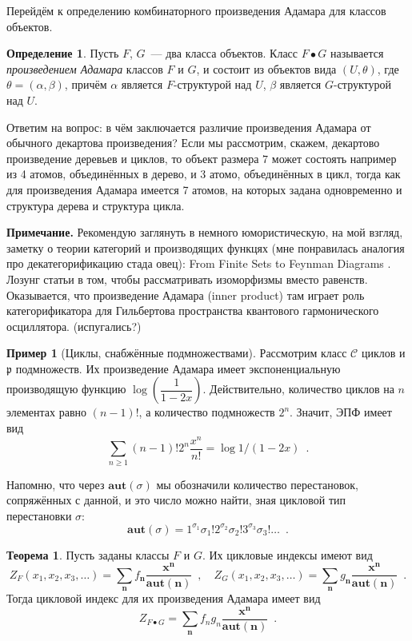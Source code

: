 \documentclass{article}
\def \vec {\boldsymbol}
\theoremstyle{definition}
\newtheorem{example}{Пример}
\newtheorem*{theorem}{Теорема}
\newtheorem*{definition}{Определение}
\begin{document}
Перейдём к определению комбинаторного произведения Адамара для классов объектов.
\begin{definition}
    Пусть \( F \), \( G\)~--- два класса объектов. Класс \( F \bullet G \)
называется \textit{произведением Адамара} классов \( F \) и \( G \), и состоит
из объектов вида \( (U, \theta) \), где \( \theta = (\alpha, \beta) \), причём
\(\alpha \) является \(F\)-структурой над \(U \), \(\beta\) является
\(G\)-структурой над \( U \).
\end{definition}
Ответим на вопрос: в чём заключается различие произведения Адамара от обычного
декартова произведения? Если мы рассмотрим, скажем, декартово произведение
деревьев и циклов, то объект размера \( 7 \) может состоять например из 4
атомов, объединённых в дерево, и 3 атомо, объединённых в цикл, тогда как для
произведения Адамара имеется 7 атомов, на которых задана одновременно и
структура дерева и структура цикла.

{\footnotesize
\textbf{Примечание.} Рекомендую заглянуть в немного юмористическую, на мой
взгляд, заметку о теории категорий и производящих функцях
(мне понравилась аналогия про декатегорификацию стада овец): From Finite Sets to Feynman Diagrams
\cite{category_feynman}. Лозунг статьи в том, чтобы рассматривать изоморфизмы
вместо равенств. Оказывается, что произведение Адамара (inner product)
там играет роль категорификатора для Гильбертова пространства квантового
гармонического осциллятора. (испугались?)
}

\begin{example}[Циклы, снабжённые подмножествами]
Рассмотрим класс \( \mathcal C \) циклов и \( \mathfrak p \) подмножеств. Их
произведение Адамара имеет экспоненциальную производящую функцию  \( \log \left(
\dfrac{1}{1 - 2x} \right) \). Действительно, количество циклов на \( n \)
элементах равно \( (n-1)! \), а количество подмножеств \( 2^n \). Значит, ЭПФ
имеет вид
\[
    \sum_{n \geq 1} (n-1)! 2^n\dfrac{x^n}{n!} = \log 1/(1-2x) \enspace .
\]
\end{example}

Напомню, что через \( \mathbf{aut}(\sigma) \) мы обозначили количество
перестановок, сопряжённых с данной, и это число можно найти, зная цикловой тип
перестановки \( \sigma \):
\[
    \mathbf{aut}(\sigma) = 1^{\sigma_1} \sigma_1! 2^{\sigma_2} \sigma_2!
3^{\sigma_3} \sigma_3 ! \ldots \enspace .
\]

\begin{theorem}
    Пусть заданы классы \( F \) и \( G \). Их цикловые индексы имеют вид
\[
    Z_F(x_1, x_2, x_3, \ldots) = \sum_{\vec n} f_{\vec n} \dfrac{\vec x^{\vec
n}}{\mathbf{aut}(\vec n)} \enspace , \quad
    Z_G(x_1, x_2, x_3, \ldots) = \sum_{\vec n} g_{\vec n} \dfrac{\vec x^{\vec
n}}{\mathbf{aut}(\vec n)} \enspace .
\]
Тогда цикловой индекс для их произведения
Адамара имеет вид
\[
    Z_{F \bullet G} = \sum_{\vec n} f_n g_n \dfrac{\vec x^{\vec
n}}{\mathbf{aut}(\vec n)} \enspace . 
\] 
\end{theorem}
\end{document}
